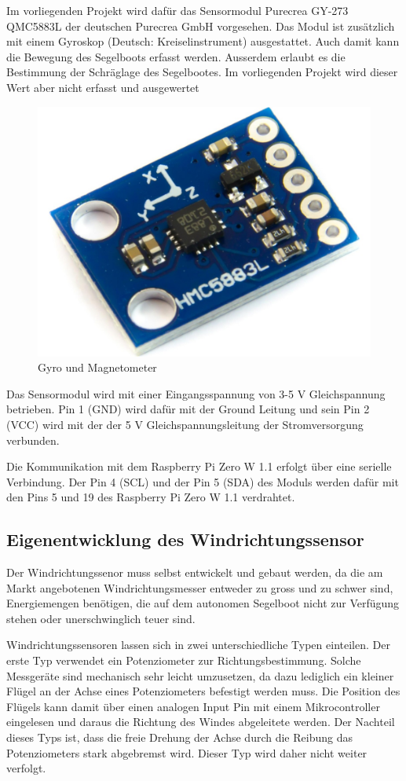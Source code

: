 Im vorliegenden Projekt wird dafür das Sensormodul Purecrea GY-273 QMC5883L der deutschen Purecrea GmbH vorgesehen. Das Modul ist zusätzlich mit einem Gyroskop (Deutsch: Kreiselinstrument) ausgestattet. Auch damit kann die Bewegung des Segelboots erfasst werden. Ausserdem erlaubt es die Bestimmung der Schräglage des Segelbootes. Im vorliegenden Projekt wird dieser Wert aber nicht erfasst und ausgewertet

\begin{figure}[H]
    \centering
    \includegraphics[width=0.5\linewidth]{assets/magnetometer.jpg}
    \caption{Gyro und Magnetometer}
\end{figure}

Das Sensormodul wird mit einer Eingangsspannung von 3-5 V Gleichspannung betrieben. Pin 1 (GND) wird dafür mit der Ground Leitung und sein Pin 2 (VCC) wird mit der der 5 V Gleichspannungsleitung der Stromversorgung verbunden.

Die Kommunikation mit dem Raspberry Pi Zero W 1.1 erfolgt über eine serielle Verbindung. Der Pin 4 (SCL) und der Pin 5 (SDA) des Moduls werden dafür mit den Pins 5 und 19 des Raspberry Pi Zero W 1.1 verdrahtet.

\subsection{Eigenentwicklung des Windrichtungssensor}
Der Windrichtungssenor muss selbst entwickelt und gebaut werden, da die am Markt angebotenen Windrichtungsmesser entweder zu gross und zu schwer sind, Energiemengen benötigen, die auf dem autonomen Segelboot nicht zur Verfügung stehen oder unerschwinglich teuer sind.

Windrichtungssensoren lassen sich in zwei unterschiedliche Typen einteilen. Der erste Typ verwendet ein Potenziometer zur Richtungsbestimmung. Solche Messgeräte sind mechanisch sehr leicht umzusetzen, da dazu lediglich ein kleiner Flügel an der Achse eines Potenziometers befestigt werden muss. Die Position des Flügels kann damit über einen analogen Input Pin mit einem Mikrocontroller eingelesen und daraus die Richtung des Windes abgeleitete werden. Der Nachteil dieses Typs ist, dass die freie Drehung der Achse durch die Reibung das Potenziometers stark abgebremst wird. Dieser Typ wird daher nicht weiter verfolgt.

